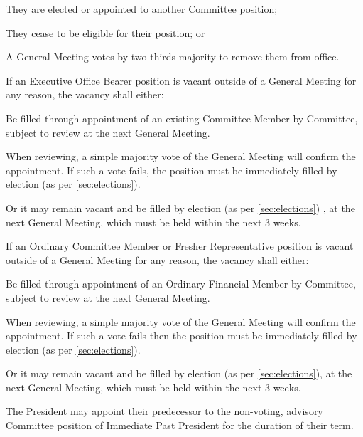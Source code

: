 \documentclass[a4paper]{article}
\begin{document}
\begin{myEnumerate}
\begin{myEnumerate}
            \item They are elected or appointed to another Committee position; 
            \item They cease to be eligible for their position; or
            \item A General Meeting votes by two-thirds majority  to remove them from office.
        \end{myEnumerate}
    \item \label{item:exec_vacancy} If an Executive Office Bearer position is vacant outside of a General Meeting for any reason, the vacancy shall either:
        \begin{myEnumerate}
            \item Be filled through appointment of an existing Committee Member by Committee, subject to review at the next General Meeting.
                \begin{myEnumerate}
                    \item When reviewing, a simple majority vote of the General Meeting will confirm the appointment. If such a vote fails, the position must be immediately filled by election (as per \cref{sec:elections}).
                \end{myEnumerate}
            \item Or it may remain vacant and be filled by election (as per \cref{sec:elections}) , at the next General Meeting, which must be held within the next 3 weeks.
        \end{myEnumerate}
    \item \label{item:ocm_vacancy} If an Ordinary Committee Member or Fresher Representative position is vacant outside of a General Meeting for any reason, the vacancy shall either:
        \begin{myEnumerate}
            \item Be filled through appointment of an Ordinary Financial Member by Committee, subject to review at the next General Meeting.
                \begin{myEnumerate}
                    \item When reviewing, a simple majority vote of the General Meeting will confirm the appointment. If such a vote fails then the position must be immediately filled by election (as per \cref{sec:elections}).
                \end{myEnumerate}
            \item Or it may remain vacant and be filled by election (as per \cref{sec:elections}), at the next General Meeting, which must be held within the next 3 weeks.
        \end{myEnumerate}
    \item The President may appoint their predecessor to the non-voting, advisory Committee position of Immediate Past President for the duration of their term.
\end{myEnumerate}
\end{document}
